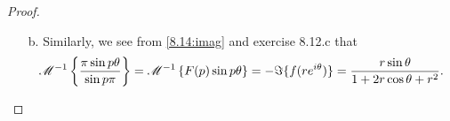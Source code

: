 \begin{proof}
\begin{enumerate}
    \item[b.] Similarly, we see from \eqref{8.14:imag} and exercise 8.12.c that
      \begin{align*}
        \mathscr{M}^{-1}\left\{ {\frac{\pi \sin p\theta}{\sin p\pi}} \right\} = \mathscr{M}^{-1}\left\{ {F(p)\sin p\theta} \right\} = -\Im{\{f(re^{i\theta})\}} = \frac{r\sin\theta}{1  +2r \cos\theta + r^2}.
      \end{align*}
  \end{enumerate}
\end{proof}
\newpage
